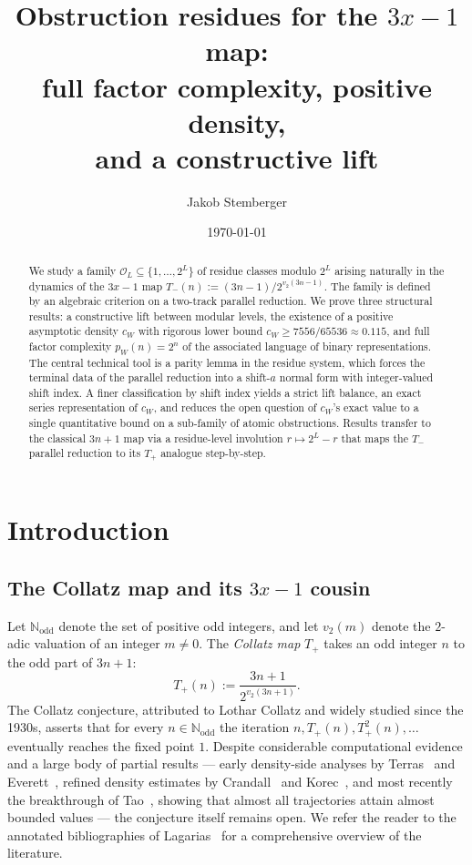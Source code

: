 \documentclass[11pt,reqno]{amsart}
\title[Obstruction residues for the $3x-1$ map]{Obstruction residues for the \texorpdfstring{$3x-1$}{3x-1} map:\\
  full factor complexity, positive density,\\ and a constructive lift}
\author{Jakob Stemberger}
\date{\today}
\theoremstyle{plain}
\theoremstyle{definition}
\theoremstyle{remark}
\newcommand{\Tplus}{T_{+}}
\newcommand{\Tminus}{T_{-}}
\newcommand{\N}{\mathbb{N}}
\newcommand{\Nodd}{\N_{\mathrm{odd}}}
\newcommand{\Obs}{\mathcal{O}}
\newcommand{\vtwo}{v_{2}}
\begin{document}
\begin{abstract}
We study a family $\Obs_L \subseteq \{1, \ldots, 2^L\}$ of residue classes
modulo $2^L$ arising naturally in the dynamics of the $3x-1$ map
$\Tminus(n) := (3n-1)/2^{\vtwo(3n-1)}$. The family is defined by an
algebraic criterion on a two-track parallel reduction.
We prove three structural results: a constructive lift between
modular levels, the existence of a positive asymptotic density $c_W$
with rigorous lower bound $c_W \ge 7556/65536 \approx 0.115$, and full
factor complexity $p_W(n) = 2^n$ of the associated language of binary
representations.
The central technical tool is a parity lemma in the residue system, which
forces the terminal data of the parallel reduction into a shift-$a$ normal
form with integer-valued shift index. A finer classification by shift
index yields a strict lift balance, an exact series representation of
$c_W$, and reduces the open question of $c_W$'s exact value to a single
quantitative bound on a sub-family of atomic obstructions. Results
transfer to the classical $3n+1$ map via a residue-level involution
$r \mapsto 2^L - r$ that maps the $\Tminus$ parallel reduction to its
$\Tplus$ analogue step-by-step.
\end{abstract}

\maketitle

\section{Introduction}

\subsection{The Collatz map and its \texorpdfstring{$3x-1$}{3x-1} cousin}

Let $\Nodd$ denote the set of positive odd integers, and let $\vtwo(m)$ denote
the $2$-adic valuation of an integer $m \ne 0$. The \emph{Collatz map}
$\Tplus$ takes an odd integer $n$ to the odd part of $3n+1$:
\[
\Tplus(n) := \frac{3n+1}{2^{\vtwo(3n+1)}}.
\]
The Collatz conjecture, attributed to Lothar Collatz and widely studied since
the 1930s, asserts that for every $n \in \Nodd$ the iteration
$n, \Tplus(n), \Tplus^2(n), \ldots$ eventually reaches the fixed point $1$.
Despite considerable computational evidence and a large body of partial
results --- early density-side analyses by Terras~\cite{Terras1976} and
Everett~\cite{Everett1977}, refined density estimates by
Crandall~\cite{Crandall1978} and Korec~\cite{Korec1994}, and most recently
the breakthrough of Tao~\cite{Tao2022}, showing that almost all
trajectories attain almost bounded values --- the conjecture itself
remains open. We refer the reader
to the annotated bibliographies of Lagarias~\cite{Lagarias2010,Lagarias2010bib}
for a comprehensive overview of the literature.
\end{document}
